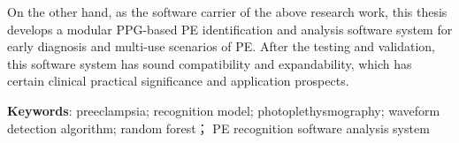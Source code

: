 On the other hand, as the software carrier of the above research work, this thesis develops a modular PPG-based PE identification and analysis software 
system for early diagnosis and multi-use scenarios of PE.
After the testing and validation, this software system has sound compatibility and expandability, which has certain clinical practical significance and application 
prospects.

\vspace{2em}

\textbf{Keywords}: preeclampsia; recognition model; photoplethysmography; waveform detection algorithm; random forest；
PE recognition software analysis system